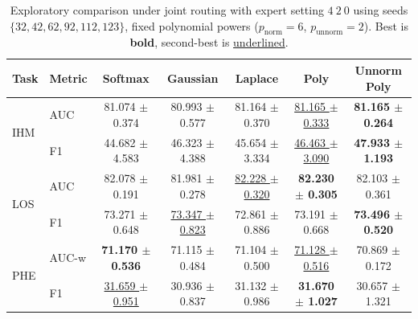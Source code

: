 \begin{table}[h]
\centering
\small
\setlength{\tabcolsep}{4pt}
\begin{tabular}{llccccc}
\toprule
Task & Metric & Softmax & Gaussian & Laplace & Poly & Unnorm Poly \\
\midrule
\multirow{2}{*}{IHM} & AUC & 81.074 $\pm$ 0.374 & 80.993 $\pm$ 0.577 & 81.164 $\pm$ 0.370 & \underline{81.165 $\pm$ 0.333} & \textbf{81.165 $\pm$ 0.264} \\
 & F1 & 44.682 $\pm$ 4.583 & 46.323 $\pm$ 4.388 & 45.654 $\pm$ 3.334 & \underline{46.463 $\pm$ 3.090} & \textbf{47.933 $\pm$ 1.193} \\
\midrule
\multirow{2}{*}{LOS} & AUC & 82.078 $\pm$ 0.191 & 81.981 $\pm$ 0.278 & \underline{82.228 $\pm$ 0.320} & \textbf{82.230 $\pm$ 0.305} & 82.103 $\pm$ 0.361 \\
 & F1 & 73.271 $\pm$ 0.648 & \underline{73.347 $\pm$ 0.823} & 72.861 $\pm$ 0.886 & 73.191 $\pm$ 0.668 & \textbf{73.496 $\pm$ 0.520} \\
\midrule
\multirow{2}{*}{PHE} & AUC-w & \textbf{71.170 $\pm$ 0.536} & 71.115 $\pm$ 0.484 & 71.104 $\pm$ 0.500 & \underline{71.128 $\pm$ 0.516} & 70.869 $\pm$ 0.172 \\
 & F1 & \underline{31.659 $\pm$ 0.951} & 30.936 $\pm$ 0.837 & 31.132 $\pm$ 0.986 & \textbf{31.670 $\pm$ 1.027} & 30.657 $\pm$ 1.321 \\
\bottomrule
\end{tabular}
\caption{Exploratory comparison under joint routing with expert setting $4\ 2\ 0$ using seeds $\{32,42,62,92,112,123\}$, fixed polynomial powers ($p_\text{norm}=6$, $p_\text{unnorm}=2$). Best is \textbf{bold}, second-best is \underline{underlined}.}
\label{tab:explore_compromise2_constp6p2_6seed_32426292112123_joint420_gating_table}
\end{table}
